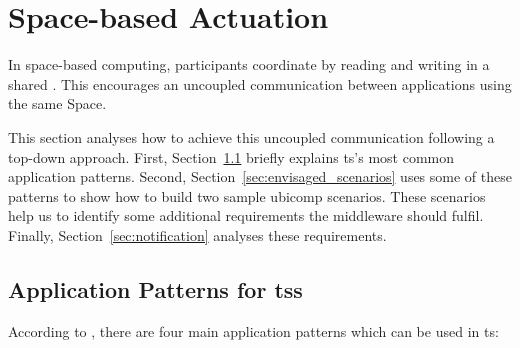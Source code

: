 \section{Space-based Actuation}
\label{sec:actuation_space}



In space-based computing, participants coordinate by reading and writing in a shared \Space{}.
This encourages an uncoupled communication between applications using the same Space.


This section analyses how to achieve this uncoupled communication following a top-down approach.
First, Section~\ref{sec:ts_patterns} briefly explains \acl{ts}'s most common application patterns. %
Second, Section~\ref{sec:envisaged_scenarios} uses some of these patterns to show how to build two sample \ac{ubicomp} scenarios.
These scenarios help us to identify some additional requirements the middleware should fulfil.
Finally, Section~\ref{sec:notification} analyses these requirements.



\subsection{Application Patterns for \aclp{ts}}
\label{sec:ts_patterns}

According to \citet{freeman_javaspaces_1999}, there are four main application patterns which can be used in \ac{ts}:

